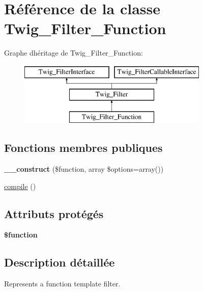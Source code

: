 \hypertarget{class_twig___filter___function}{}\section{Référence de la classe Twig\+\_\+\+Filter\+\_\+\+Function}
\label{class_twig___filter___function}
Graphe d\textquotesingle{}héritage de Twig\+\_\+\+Filter\+\_\+\+Function\+:\begin{figure}[H]
\begin{center}
\leavevmode
\includegraphics[height=3.000000cm]{class_twig___filter___function}
\end{center}
\end{figure}
\subsection*{Fonctions membres publiques}
\begin{DoxyCompactItemize}
\item 
{\bfseries \+\_\+\+\_\+construct} (\$function, array \$options=array())\hypertarget{class_twig___filter___function_ae6ad9907bb7237c92e880ca6bfd16469}{}\label{class_twig___filter___function_ae6ad9907bb7237c92e880ca6bfd16469}

\item 
\hyperlink{class_twig___filter___function_a3815e7c2e73f00c2ebffcf5b90eef3b1}{compile} ()
\end{DoxyCompactItemize}
\subsection*{Attributs protégés}
\begin{DoxyCompactItemize}
\item 
{\bfseries \$function}\hypertarget{class_twig___filter___function_af3e5d0d1ff43879d493dd97bb760c479}{}\label{class_twig___filter___function_af3e5d0d1ff43879d493dd97bb760c479}

\end{DoxyCompactItemize}


\subsection{Description détaillée}
Represents a function template filter.


